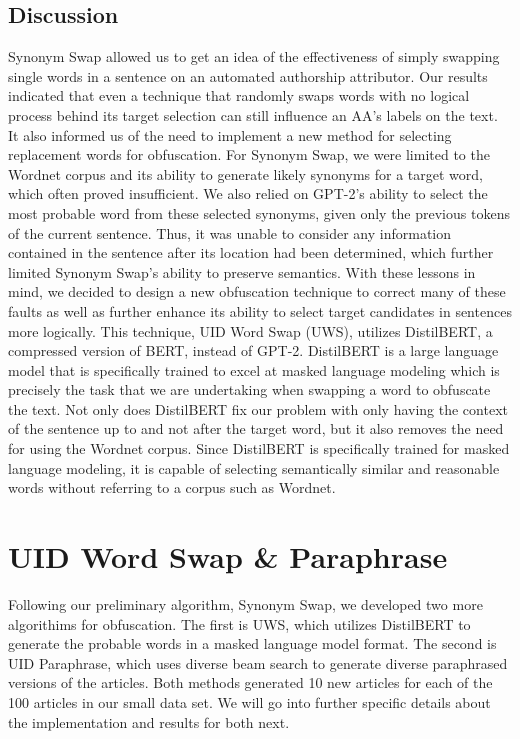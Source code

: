 \documentclass{article}
\begin{document}
\subsection{Discussion}
Synonym Swap allowed us to get an idea of the effectiveness of simply swapping single words in a sentence on an automated authorship attributor. Our results indicated that even a technique that randomly swaps words with no logical process behind its target selection can still influence an AA’s labels on the text. It also informed us of the need to implement a new method for selecting replacement words for obfuscation. For Synonym Swap, we were limited to the Wordnet corpus and its ability to generate likely synonyms for a target word, which often proved insufficient. We also relied on GPT-2’s ability to select the most probable word from these selected synonyms, given only the previous tokens of the current sentence. Thus, it was unable to consider any information contained in the sentence after its location had been determined, which further limited Synonym Swap’s ability to preserve semantics.
With these lessons in mind, we decided to design a new obfuscation technique to correct many of these faults as well as further enhance its ability to select target candidates in sentences more logically. This technique, UID Word Swap (UWS), utilizes DistilBERT, a compressed version of BERT, instead of GPT-2. DistilBERT is a large language model that is specifically trained to excel at masked language modeling which is precisely the task that we are undertaking when swapping a word to obfuscate the text. Not only does DistilBERT fix our problem with only having the context of the sentence up to and not after the target word, but it also removes the need for using the Wordnet corpus. Since DistilBERT is specifically trained for masked language modeling, it is capable of selecting semantically similar and reasonable words without referring to a corpus such as Wordnet.

\section{UID Word Swap \& Paraphrase}
Following our preliminary algorithm, Synonym Swap, we developed two more algorithims for obfuscation. The first is UWS, which utilizes DistilBERT to generate the probable words in a masked language model format. The second is UID Paraphrase, which uses diverse beam search to generate diverse paraphrased versions of the articles. Both methods generated 10 new articles for each of the 100 articles in our small data set. We will go into further specific details about the implementation and results for both next.
\end{document}
